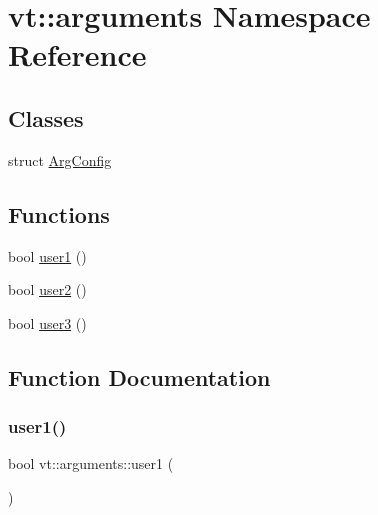 \hypertarget{namespacevt_1_1arguments}{}\section{vt\+:\+:arguments Namespace Reference}
\label{namespacevt_1_1arguments}
\subsection*{Classes}
\begin{DoxyCompactItemize}
\item 
struct \hyperlink{structvt_1_1arguments_1_1_arg_config}{Arg\+Config}
\end{DoxyCompactItemize}
\subsection*{Functions}
\begin{DoxyCompactItemize}
\item 
bool \hyperlink{namespacevt_1_1arguments_afe229ddf0b473e54fac5ff6884b07ad0}{user1} ()
\item 
bool \hyperlink{namespacevt_1_1arguments_ae58fe1d056c863f7d8103e9c240d17f2}{user2} ()
\item 
bool \hyperlink{namespacevt_1_1arguments_afedf2c9949568b862ec5f8274ef6846b}{user3} ()
\end{DoxyCompactItemize}


\subsection{Function Documentation}
\mbox{\label{namespacevt_1_1arguments_afe229ddf0b473e54fac5ff6884b07ad0}} 
\subsubsection{\texorpdfstring{user1()}{user1()}}
{\footnotesize\ttfamily bool vt\+::arguments\+::user1 (\begin{DoxyParamCaption}{ }\end{DoxyParamCaption})\hspace{0.3cm}{\ttfamily [inline]}}

\mbox{\label{namespacevt_1_1arguments_ae58fe1d056c863f7d8103e9c240d17f2}} 
